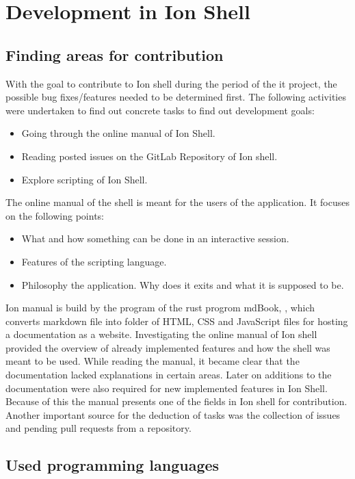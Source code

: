\chapter{Development in Ion Shell}

\section{Finding areas for contribution}

With the goal to contribute to Ion shell during the period of the it project, the possible bug fixes/features needed to be determined first.
The following activities were undertaken to find out concrete tasks to find out development goals:

\begin{itemize}
	\item Going through the online manual of Ion Shell.
	\item Reading posted issues on the GitLab Repository of Ion shell.
	\item Explore scripting of Ion Shell.
\end{itemize}

The online manual of the shell is meant for the users of the application.
It focuses on the following points:

\begin{itemize}
	\item What and how something can be done in an interactive session.
	\item Features of the scripting language.
	\item Philosophy the application. Why does it exits and what it is supposed to be.
\end{itemize}

Ion manual is build by the program of the rust progrom mdBook, \cite{mdBook}, which converts markdown file into folder of
HTML, CSS and JavaScript files for hosting a documentation as a website.
Investigating the online manual of Ion shell provided the overview of already implemented features and how the shell was meant to be used.
While reading the manual, it became clear that the documentation lacked explanations in certain areas.
Later on additions to the documentation were also required for new implemented features in Ion Shell.
Because of this the manual presents one of the fields in Ion shell for contribution.
Another important source for the deduction of tasks was the collection of issues and pending pull requests from a repository.

\section{Used programming languages}

